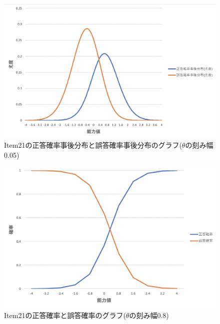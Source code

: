 \documentclass[12pt]{jarticle}
\begin{document}
\clearpage
\begin{figure}[h]
    \begin{center}
        \includegraphics[scale=0.3]{kadai5_2_5.png}
    \end{center}
    \caption{Item21の正答確率事後分布と誤答確率事後分布のグラフ($\theta$の刻み幅0.05)}
\end{figure}
\begin{figure}[h]
    \begin{center}
        \includegraphics[scale=0.3]{kadai5_2_6.png}
    \end{center}
    \caption{Item21の正答確率と誤答確率のグラフ($\theta$の刻み幅0.8)}
\end{figure}
\end{document}
